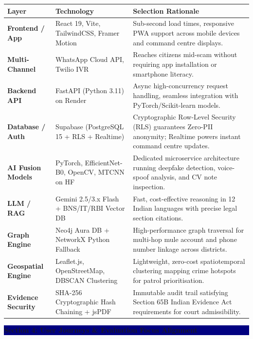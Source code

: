 \documentclass[10pt]{article}
\newcommand{\sectionbanner}[2]{%
  \needspace{4\baselineskip}
  \vspace{6pt}
  \noindent\colorbox{navy}{\parbox{\dimexpr\linewidth-16pt}{\vspace{3pt}\color{white}\bfseries\large Section #1: #2\vspace{3pt}}}%
  \vspace{5pt}
}
\newcommand{\subhead}[1]{\vspace{6pt}\noindent{\color{navy}\bfseries\large #1}\vspace{3pt}\par}
\begin{document}
\subhead{3.2 Technology Stack}
\begin{tabularx}{\linewidth}{|>{\small}p{28mm}|>{\small}p{50mm}|X|}
\hline
\rowcolor{blueh}\color{white}\bfseries Layer & \color{white}\bfseries Technology & \color{white}\bfseries\small Selection Rationale \\ \hline
\textbf{Frontend / App} & React 19, Vite, TailwindCSS, Framer Motion & \small Sub-second load times, responsive PWA support across mobile devices and command centre displays. \\ \hline
\textbf{Multi-Channel} & WhatsApp Cloud API, Twilio IVR & \small Reaches citizens mid-scam without requiring app installation or smartphone literacy. \\ \hline
\textbf{Backend API} & FastAPI (Python 3.11) on Render & \small Async high-concurrency request handling, seamless integration with PyTorch/Scikit-learn models. \\ \hline
\textbf{Database / Auth} & Supabase (PostgreSQL 15 + RLS + Realtime) & \small Cryptographic Row-Level Security (RLS) guarantees Zero-PII anonymity; Realtime powers instant command centre updates. \\ \hline
\textbf{AI Fusion Models} & PyTorch, EfficientNet-B0, OpenCV, MTCNN on HF & \small Dedicated microservice architecture running deepfake detection, voice-spoof analysis, and CV note inspection. \\ \hline
\textbf{LLM / RAG} & Gemini 2.5/3.x Flash + BNS/IT/RBI Vector DB & \small Fast, cost-effective reasoning in 12 Indian languages with precise legal section citations. \\ \hline
\textbf{Graph Engine} & Neo4j Aura DB + NetworkX Python Fallback & \small High-performance graph traversal for multi-hop mule account and phone number linkage across districts. \\ \hline
\textbf{Geospatial Engine} & Leaflet.js, OpenStreetMap, DBSCAN Clustering & \small Lightweight, zero-cost spatiotemporal clustering mapping crime hotspots for patrol prioritisation. \\ \hline
\textbf{Evidence Security} & SHA-256 Cryptographic Hash Chaining + jsPDF & \small Immutable audit trail satisfying Section 65B Indian Evidence Act requirements for court admissibility. \\ \hline
\end{tabularx}

\newpage
\sectionbanner{4}{User Journeys \& Evaluation Focus Alignment}
\end{document}
